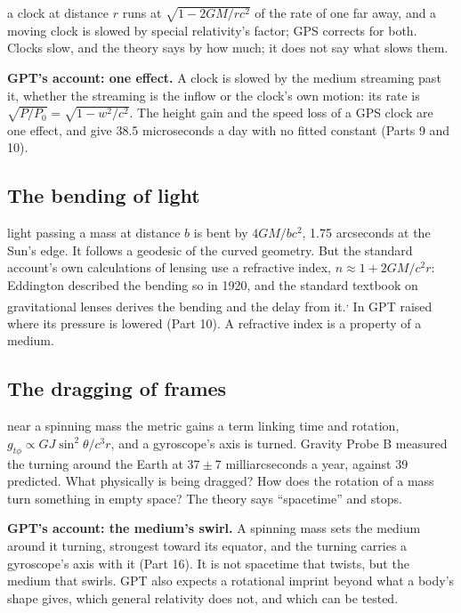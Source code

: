 \documentclass[11pt,a4paper]{article}
\begin{document}
 a clock at distance $r$ runs at $\sqrt{1-2GM/rc^2}$ of the rate of one far away, and a moving clock is slowed by special relativity's factor; GPS corrects for both. Clocks slow, and the theory says by how much; it does not say what slows them.

\begin{hypbar}
\textbf{GPT's account: one effect.} A clock is slowed by the medium streaming past it, whether the streaming is the inflow or the clock's own motion: its rate is $\sqrt{P/P_0} = \sqrt{1-w^2/c^2}$. The height gain and the speed loss of a GPS clock are one effect, and give 38.5 microseconds a day with no fitted constant (Parts 9 and 10).\footnotemark{}
\end{hypbar}

\subsection{The bending of light}

 light passing a mass at distance $b$ is bent by $4GM/bc^2$, 1.75 arcseconds at the Sun's edge. It follows a geodesic of the curved geometry. But the standard account's own calculations of lensing use a refractive index, $n \approx 1 + 2GM/c^2r$: Eddington described the bending so in 1920, and the standard textbook on gravitational lenses derives the bending and the delay from it.\textsuperscript{,} In GPT  raised where its pressure is lowered (Part 10). A refractive index is a property of a medium.

\subsection{The dragging of frames}

 near a spinning mass the metric gains a term linking time and rotation, $g_{t\phi} \propto GJ\sin^2\theta/c^3r$, and a gyroscope's axis is turned. Gravity Probe B measured the turning around the Earth at $37\pm7$ milliarcseconds a year, against 39 predicted. What physically is being dragged? How does the rotation of a mass turn something in empty space? The theory says ``spacetime'' and stops.

\begin{hypbar}
\textbf{GPT's account: the medium's swirl.} A spinning mass sets the medium around it turning, strongest toward its equator, and the turning carries a gyroscope's axis with it (Part 16).\footnotemark{} It is not spacetime that twists, but the medium that swirls. GPT also expects a rotational imprint beyond what a body's shape gives, which general relativity does not, and which can be tested.
\end{hypbar}
\end{document}
